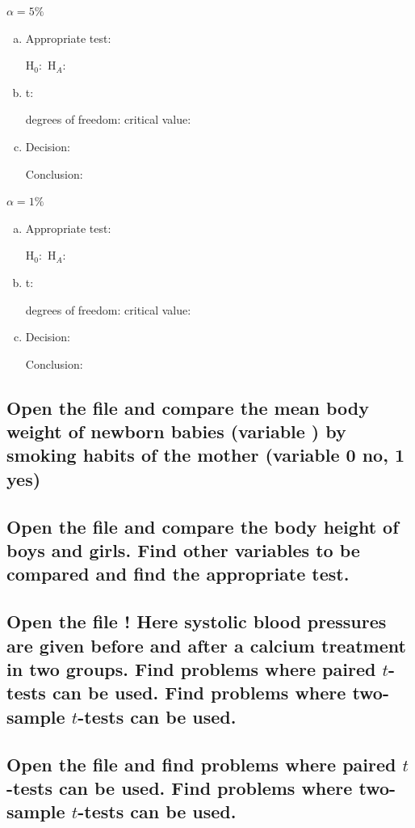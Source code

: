 	\begin{multicols}{2}
	
	$\alpha=5\%$
		\begin{enumerate}[a)]
		\item Appropriate test: \hrulefill
		
				H$_0:$	 \hrulefill
				H$_A$:	 \hrulefill
	\item t: 	 \hrulefill

			degrees of freedom: \hrulefill  \quad 
			critical value: \hrulefill
		\item Decision: 	 \hrulefill

				Conclusion: \hrulefill
		\end{enumerate}
	\columnbreak
			$\alpha=1\%$
		\begin{enumerate}[a)]
		\item Appropriate test: \hrulefill

			H$_0:$	 \hrulefill
			 H$_A$:	 \hrulefill
		\item t: 	 \hrulefill

			degrees of freedom: \hrulefill  \quad 
			critical value: \hrulefill

		\item Decision: 	 \hrulefill

				Conclusion: \hrulefill
		\end{enumerate}
	\end{multicols}	

\subsection[LWTBWT.csv]{Open the file  and compare the mean body weight of newborn babies (variable ) by smoking habits of the mother (variable   0 no, 1 yes)} 


\subsection[ANTHROPOMETRICS.csv]{Open the file  and compare the body height of boys and girls. Find other variables to be compared and find the appropriate test.}

\subsection[CALC.csv]{Open the file ! Here systolic blood pressures are given before and after a calcium treatment in two groups. Find problems where paired $t$-tests can be used. Find problems where two-sample $t$-tests can be used. }

\subsection[NEWDRUG.csv]{Open the file  and find problems where paired $t$-tests can be used. Find problems where two-sample $t$-tests can be used.}
